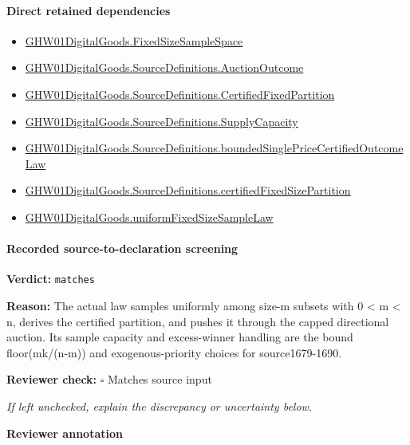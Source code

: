 \documentclass[10pt]{article}
\newcommand{\reviewerbox}{%
  \par\noindent\fbox{\parbox{0.96\linewidth}{\rule{0pt}{0.38in}}}\par
}
\newcommand{\reviewmatch}[1]{%
  \par\noindent\textbf{Reviewer check:} $\square$\; #1\par
  \noindent\emph{If left unchecked, explain the discrepancy or uncertainty below.}\par
}
\begin{document}
\paragraph{Direct retained dependencies}
\begin{itemize}\raggedright
\item \hyperlink{governing-declaration-54cc4fd1a8d109e5}{GHW01\allowbreak{}Digital\allowbreak{}Goods.\allowbreak{}Fixed\allowbreak{}Size\allowbreak{}Sample\allowbreak{}Space}
\item \hyperlink{paper-prerequisite-fc173e8d557afd08}{GHW01\allowbreak{}Digital\allowbreak{}Goods.\allowbreak{}Source\allowbreak{}Definitions.\allowbreak{}Auction\allowbreak{}Outcome}
\item \hyperlink{governing-declaration-7e9b17e7aa39edc2}{GHW01\allowbreak{}Digital\allowbreak{}Goods.\allowbreak{}Source\allowbreak{}Definitions.\allowbreak{}Certified\allowbreak{}Fixed\allowbreak{}Partition}
\item \hyperlink{governing-declaration-b45673e2f2fa9536}{GHW01\allowbreak{}Digital\allowbreak{}Goods.\allowbreak{}Source\allowbreak{}Definitions.\allowbreak{}Supply\allowbreak{}Capacity}
\item \hyperlink{governing-declaration-6eb5aa78b5f44e9b}{GHW01\allowbreak{}Digital\allowbreak{}Goods.\allowbreak{}Source\allowbreak{}Definitions.\allowbreak{}bounded\allowbreak{}Single\allowbreak{}Price\allowbreak{}Certified\allowbreak{}Outcome\allowbreak{}Law}
\item \hyperlink{governing-declaration-533616bc47e09944}{GHW01\allowbreak{}Digital\allowbreak{}Goods.\allowbreak{}Source\allowbreak{}Definitions.\allowbreak{}certified\allowbreak{}Fixed\allowbreak{}Size\allowbreak{}Partition}
\item \hyperlink{governing-declaration-e45e78c6f46e232c}{GHW01\allowbreak{}Digital\allowbreak{}Goods.\allowbreak{}uniform\allowbreak{}Fixed\allowbreak{}Size\allowbreak{}Sample\allowbreak{}Law}
\end{itemize}
\paragraph{Recorded source-to-declaration screening}
\textbf{Verdict:} \texttt{matches}
\\
{\raggedright
\textbf{Reason:} The actual law samples uniformly among size-\allowbreak{}m subsets with 0 < m < n, derives the certified partition, and pushes it through the capped directional auction.\allowbreak{} Its sample capacity and excess-\allowbreak{}winner handling are the bound floor(mk/\allowbreak{}(n-\allowbreak{}m)) and exogenous-\allowbreak{}priority choices for source1679-\allowbreak{}1690.\allowbreak{}
\par}
\reviewmatch{Matches source input}
\noindent\textbf{Reviewer annotation}\par
\reviewerbox
\clearpage
\hypertarget{paper-prerequisite-d8c8e75f6c7cee61}{}
\end{document}
